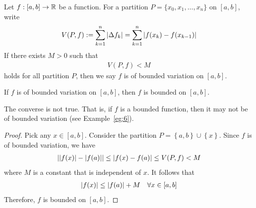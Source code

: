 \documentclass[thmcnt=section, 12pt]{my-elegantbook}
\begin{document}

\begin{definition}
    Let $f: [a, b] \to \mathbb{R}$ be a function. For a partition $P = \{ x_0, x_1, \ldots, x_n \}$ on $[a, b]$, write
    \begin{align*}
        V(P, f) := \sum_{k=1}^n \left\lvert \Delta f_k \right\rvert = \sum_{k=1}^n \left\lvert f(x_k) - f(x_{k-1}) \right\rvert
    \end{align*}
    If there exists $M > 0$ such that
    \begin{align*}
        V(P, f) < M
    \end{align*}
    holds for all partition $P$, then we say $f$ is of bounded variation on $[a, b]$.
\end{definition}


\begin{theorem} \label{thm:35}
    If $f$ is of bounded variation on $[a, b]$, then $f$ is bounded on $[a, b]$.
\end{theorem}

\begin{remark}
    The converse is not true. That is, if $f$ is a bounded function, then it may not be of bounded variation (see Example~\ref{eg:6}).
\end{remark}

\begin{proof}
    Pick any $x \in [a, b]$. Consider the partition $P = \left\{a, b\right\} \cup \left\{x\right\}$. Since $f$ is of bounded variation, we have 
    \begin{align*}
        \left\lvert \left\lvert f(x) \right\rvert - \left\lvert f(a) \right\rvert \right\rvert
        \leq \left\lvert f(x) - f(a) \right\rvert
        \leq V(P, f)
        < M
    \end{align*}
    where $M$ is a constant that is independent of $x$. It follows that 
    \begin{align*}
        \left\lvert f(x) \right\rvert \leq \left\lvert f(a) \right\rvert + M
        \quad \forall x \in [a, b]
    \end{align*}
    Therefore, $f$ is bounded on $[a, b]$.
\end{proof}
\end{document}

